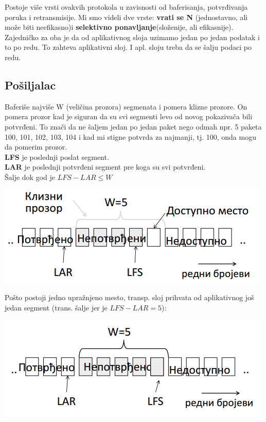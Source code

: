 \documentclass{article} %
\begin{document}
 Postoje više vrsti ovakvih protokola u zavisnosti od baferisanja, potvrđivanja poruka i retransmisije. Mi smo videli dve vrste: \textbf{vrati se N} (jednostavno, ali može biti neefikasno)i \textbf{selektivno ponavljanje}(složenije, ali efikasnije). Zajedničko za oba je da od aplikativnog sloja uzimamo jedan po jedan podatak i to po redu. To zahteva aplikativni sloj. I apl. sloju treba da se šalju podaci po redu.
 \subsection{Pošiljalac}
 Baferiše najviše W (veličina prozora) segmenata i pomera klizne prozore. On pomera prozor kad je siguran da su svi segmenti levo od novog pokazivača bili potvrđeni. To znači da ne šaljem jedan po jedan paket nego odmah npr. 5 paketa 100, 101, 102, 103, 104 i kad mi stigne potvrda za najmanji, tj. 100, onda mogu da pomerim prozor.\\
 \textbf{ LFS} je poslednji poslat segment.\\
 \textbf{LAR} je poslednji potvrđeni segment pre koga su svi potvrđeni.\\
 Šalje dok god je $ LFS - LAR \leq  W $
 \begin{center}
	\includegraphics[scale=0.5]{kliproz}
\end{center}
Pošto postoji jedno upražnjeno mesto, transp. sloj prihvata od aplikativnog još jedan segment (trans. šalje jer je $ LFS - LAR = 5 $):
 \begin{center}
	\includegraphics[scale=0.5]{klizproz1}
\end{center}
\end{document}
